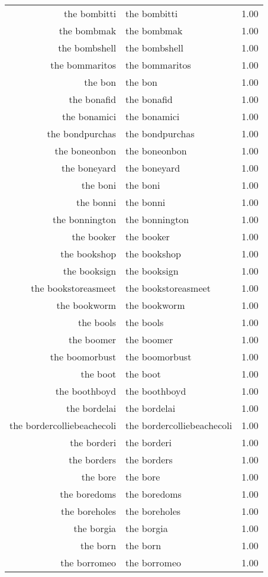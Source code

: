 \begin{table}[ht]
\begin{tabular}{rlr}
  the bombitti & the bombitti & 1.00 \\ 
  the bombmak & the bombmak & 1.00 \\ 
  the bombshell & the bombshell & 1.00 \\ 
  the bommaritos & the bommaritos & 1.00 \\ 
  the bon & the bon & 1.00 \\ 
  the bonafid & the bonafid & 1.00 \\ 
  the bonamici & the bonamici & 1.00 \\ 
  the bondpurchas & the bondpurchas & 1.00 \\ 
  the boneonbon & the boneonbon & 1.00 \\ 
  the boneyard & the boneyard & 1.00 \\ 
  the boni & the boni & 1.00 \\ 
  the bonni & the bonni & 1.00 \\ 
  the bonnington & the bonnington & 1.00 \\ 
  the booker & the booker & 1.00 \\ 
  the bookshop & the bookshop & 1.00 \\ 
  the booksign & the booksign & 1.00 \\ 
  the bookstoreasmeet & the bookstoreasmeet & 1.00 \\ 
  the bookworm & the bookworm & 1.00 \\ 
  the bools & the bools & 1.00 \\ 
  the boomer & the boomer & 1.00 \\ 
  the boomorbust & the boomorbust & 1.00 \\ 
  the boot & the boot & 1.00 \\ 
  the boothboyd & the boothboyd & 1.00 \\ 
  the bordelai & the bordelai & 1.00 \\ 
  the bordercolliebeachecoli & the bordercolliebeachecoli & 1.00 \\ 
  the borderi & the borderi & 1.00 \\ 
  the borders & the borders & 1.00 \\ 
  the bore & the bore & 1.00 \\ 
  the boredoms & the boredoms & 1.00 \\ 
  the boreholes & the boreholes & 1.00 \\ 
  the borgia & the borgia & 1.00 \\ 
  the born & the born & 1.00 \\ 
  the borromeo & the borromeo & 1.00 \\ 

\end{tabular}
\end{table}

